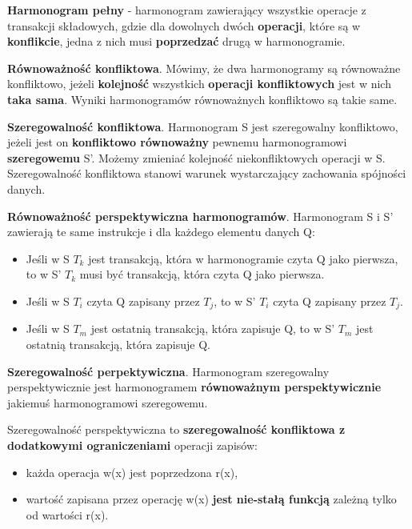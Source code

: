 \documentclass[main.tex]{subfiles}
\begin{document}
    \begin{definition}
        \textbf{Harmonogram pełny} - harmonogram zawierający wszystkie operacje z transakcji składowych, gdzie dla
        dowolnych dwóch \textbf{operacji}, które są w \textbf{konflikcie}, jedna z nich musi \textbf{poprzedzać} drugą
        w harmonogramie.
    \end{definition}

    \begin{definition}
        \textbf{Równoważność konfliktowa}. Mówimy, że dwa harmonogramy są równoważne konfliktowo, jeżeli
        \textbf{kolejność} wszystkich \textbf{operacji konfliktowych} jest w nich \textbf{taka sama}. Wyniki
        harmonogramów równoważnych konfliktowo są takie same.
    \end{definition}

    \begin{definition}
        \textbf{Szeregowalność konfliktowa}. Harmonogram S jest szeregowalny konfliktowo, jeżeli jest on
        \textbf{konfliktowo równoważny} pewnemu harmonogramowi \textbf{szeregowemu} S’. Możemy zmieniać kolejność
        niekonfliktowych operacji w S.\\

        Szeregowalność konfliktowa stanowi warunek wystarczający zachowania spójności danych.
    \end{definition}

    \begin{definition}
        \textbf{Równoważność perspektywiczna harmonogramów}. Harmonogram S i S' zawierają te same instrukcje i dla każdego
        elementu danych Q:
        \begin{itemize}
            \item Jeśli w S $T_k$ jest transakcją, która w
            harmonogramie czyta Q jako pierwsza, to w S' $T_k$ musi być transakcją, która czyta Q jako pierwsza.
            \item Jeśli w S $T_i$ czyta Q zapisany przez $T_j$, to w S' $T_i$ czyta Q zapisany przez $T_j$.
            \item Jeśli w S  $T_m$ jest ostatnią transakcją, która
            zapisuje Q, to w S' $T_m$ jest ostatnią transakcją, która zapisuje Q.
        \end{itemize}
    \end{definition}

    \begin{definition}
        \textbf{Szeregowalność perpektywiczna}. Harmonogram szeregowalny perspektywicznie jest harmonogramem
        \textbf{równoważnym perspektywicznie} jakiemuś harmonogramowi szeregowemu.

        Szeregowalność perspektywiczna to \textbf{szeregowalność konfliktowa z dodatkowymi ograniczeniami} operacji zapisów:
        \begin{itemize}
            \item każda operacja w(x) jest poprzedzona r(x),
            \item wartość zapisana przez operację w(x) \textbf{jest nie-stałą funkcją} zależną tylko od wartości r(x).
        \end{itemize}
    \end{definition}
\end{document}
